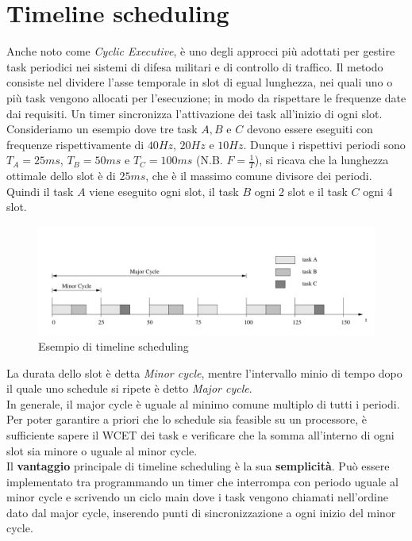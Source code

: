 \documentclass[12pt,openany,onesided]{book}
\begin{document}
\section{Timeline scheduling}
Anche noto come \textit{Cyclic Executive}, è uno degli approcci più adottati per gestire task periodici nei sistemi di difesa militari e di controllo di traffico.
Il metodo consiste nel dividere l'asse temporale in slot di egual lunghezza, nei quali uno o più task vengono allocati per l'esecuzione; in modo da rispettare le frequenze date dai requisiti.
Un timer sincronizza l'attivazione dei task all'inizio di ogni slot.\\
Consideriamo un esempio dove tre task $A,B$ e $C$ devono essere eseguiti con frequenze rispettivamente di $40Hz$, $20Hz$ e $10Hz$.
Dunque i rispettivi periodi sono $T_A=25ms$, $T_B=50ms$ e $T_C=100ms$ (N.B. $F=\frac{1}{T}$), si ricava che la lunghezza ottimale dello slot è di 
$25ms$, che è il massimo comune divisore dei periodi. Quindi il task $A$ viene eseguito ogni slot, il task $B$ ogni 2 slot e il task $C$ ogni 4 slot.
\begin{figure}[H]
    \centering
    \includegraphics[width=\textwidth]{pictures/timelineScheduling.png}
    \caption{Esempio di timeline scheduling}
\end{figure}
\noindent La durata dello slot è detta \textit{Minor cycle}, mentre l'intervallo minio di tempo dopo il quale uno schedule si ripete è detto \textit{Major cycle}.
\\
In generale, il major cycle è uguale al minimo comune multiplo di tutti i periodi. Per poter garantire a priori che lo schedule sia feasible su un processore,
è sufficiente sapere il WCET dei task e verificare che la somma all'interno di ogni slot sia minore o uguale al minor cycle.
\\
Il \textbf{vantaggio} principale di timeline scheduling è la sua \textbf{semplicità}. Può essere implementato tra programmando un timer che interrompa con periodo uguale al minor cycle
e scrivendo un ciclo main dove i task vengono chiamati nell'ordine dato dal major cycle, inserendo punti di sincronizzazione a ogni inizio del minor cycle.
\end{document}
